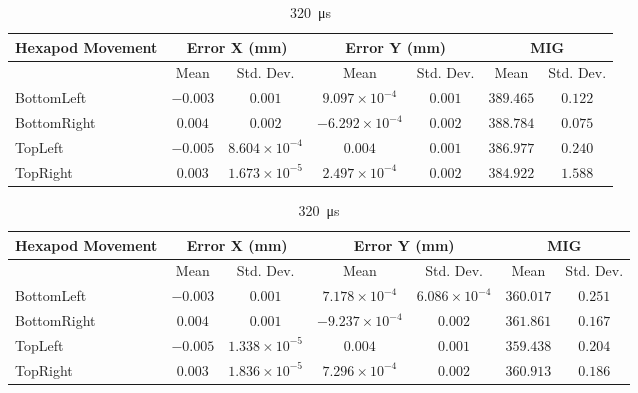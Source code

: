 \begin{table}[h]
    \vspace{10pt}

    \begin{subtable}{\textwidth}
        \centering
        \footnotesize
        \begin{tabular}{lcccccc}
            \toprule
            Hexapod Movement & \multicolumn{2}{c}{Error X (mm)} & \multicolumn{2}{c}{Error Y (mm)} & \multicolumn{2}{c}{MIG}  \\
            \midrule
            & \multicolumn{1}{c}{Mean} & \multicolumn{1}{c}{Std. Dev.} & \multicolumn{1}{c}{Mean} & \multicolumn{1}{c}{Std. Dev.} & \multicolumn{1}{c}{Mean} & \multicolumn{1}{c}{Std. Dev.} \\
            \midrule
            \textsf{BottomLeft} & $-0.003$ & $0.001$ & $9.097\times10^{-4}$ & $0.001$ & $389.465$ & $0.122$ \\
            \textsf{BottomRight} & $0.004$ & $0.002$ & $-6.292\times10^{-4}$ & $0.002$ & $388.784$ & $0.075$ \\
            \textsf{TopLeft} & $-0.005$ & $8.604\times10^{-4}$ & $0.004$ & $0.001$ & $386.977$ & $0.240$ \\
            \textsf{TopRight} & $0.003$ & $1.673\times10^{-5}$ & $2.497\times10^{-4}$ & $0.002$ & $384.922$ & $1.588$ \\
            \bottomrule
        \end{tabular}
        \caption{\SI{150}{\micro\second}}
    \end{subtable}

    \vspace{10pt}

    \begin{subtable}{\textwidth}
        \centering
        \footnotesize
        \begin{tabular}{lcccccc}
            \toprule
            Hexapod Movement & \multicolumn{2}{c}{Error X (mm)} & \multicolumn{2}{c}{Error Y (mm)} & \multicolumn{2}{c}{MIG}  \\
            \midrule
            & \multicolumn{1}{c}{Mean} & \multicolumn{1}{c}{Std. Dev.} & \multicolumn{1}{c}{Mean} & \multicolumn{1}{c}{Std. Dev.} & \multicolumn{1}{c}{Mean} & \multicolumn{1}{c}{Std. Dev.} \\
            \midrule
            \textsf{BottomLeft} & $-0.003$ & $0.001$ & $7.178\times10^{-4}$ & $6.086\times10^{-4}$ & $360.017$ & $0.251$ \\
            \textsf{BottomRight} & $0.004$ & $0.001$ & $-9.237\times10^{-4}$ & $0.002$ & $361.861$ & $0.167$ \\
            \textsf{TopLeft} & $-0.005$ & $1.338\times10^{-5}$ & $0.004$ & $0.001$ & $359.438$ & $0.204$ \\
            \textsf{TopRight} & $0.003$ & $1.836\times10^{-5}$ & $7.296\times10^{-4}$ & $0.002$ & $360.913$ & $0.186$ \\
            \bottomrule
        \end{tabular}
        \caption{\SI{320}{\micro\second}}
    \end{subtable}


\end{table}
